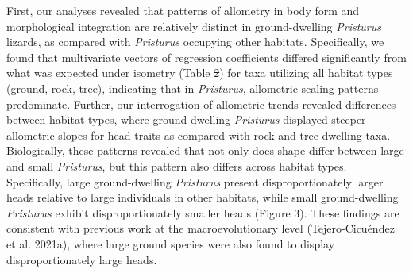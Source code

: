 \documentclass[
  11pt,
]{article}
\providecommand{\DIFaddtex}[1]{{\protect\color{blue}\uwave{#1}}} %
\providecommand{\DIFdeltex}[1]{{\protect\color{red}\sout{#1}}}                      %
\providecommand{\DIFaddbegin}{} %
\providecommand{\DIFaddend}{} %
\providecommand{\DIFdelbegin}{} %
\providecommand{\DIFdelend}{} %
\providecommand{\DIFadd}[1]{\texorpdfstring{\DIFaddtex{#1}}{#1}} %
\providecommand{\DIFdel}[1]{\texorpdfstring{\DIFdeltex{#1}}{}} %
\newcommand{\DIFscaledelfig}{0.5}
\newlength{\DIFdelgraphicswidth} %
\newlength{\DIFdelgraphicsheight} %
\newcommand{\DIFaddincludegraphics}[2][]{{\color{blue}\fbox{\DIFOincludegraphics[#1]{#2}}}} %
\newcommand{\DIFdelincludegraphics}[2][]{%
\sbox{\DIFdelgraphicsbox}{\DIFOincludegraphics[#1]{#2}}%
\settoboxwidth{\DIFdelgraphicswidth}{\DIFdelgraphicsbox} %
\settoboxtotalheight{\DIFdelgraphicsheight}{\DIFdelgraphicsbox} %
\scalebox{\DIFscaledelfig}{%
\parbox[b]{\DIFdelgraphicswidth}{\usebox{\DIFdelgraphicsbox}\\[-\baselineskip] \rule{\DIFdelgraphicswidth}{0em}}\llap{\resizebox{\DIFdelgraphicswidth}{\DIFdelgraphicsheight}{%
\setlength{\unitlength}{\DIFdelgraphicswidth}%
\begin{picture}(1,1)%
\thicklines\linethickness{2pt} %
{\color[rgb]{1,0,0}\put(0,0){\framebox(1,1){}}}%
{\color[rgb]{1,0,0}\put(0,0){\line( 1,1){1}}}%
{\color[rgb]{1,0,0}\put(0,1){\line(1,-1){1}}}%
\end{picture}%
}\hspace*{3pt}}} %
} %
\DeclareRobustCommand{\DIFaddbegin}{\DIFOaddbegin \let\includegraphics\DIFaddincludegraphics} %
\DeclareRobustCommand{\DIFaddend}{\DIFOaddend \let\includegraphics\DIFOincludegraphics} %
\DeclareRobustCommand{\DIFdelbegin}{\DIFOdelbegin \let\includegraphics\DIFdelincludegraphics} %
\DeclareRobustCommand{\DIFdelend}{\DIFOaddend \let\includegraphics\DIFOincludegraphics} %
\begin{document}
First, our analyses revealed that patterns of allometry in body form and
morphological integration are relatively distinct in ground-dwelling
\emph{Pristurus} lizards, as compared with \emph{Pristurus} occupying
other habitats. Specifically, we found that multivariate vectors of
regression coefficients differed significantly from what was expected
under isometry (Table \DIFdelbegin \DIFdel{2}\DIFdelend \DIFaddbegin \DIFadd{3}\DIFaddend ) for taxa utilizing all habitat types (ground,
rock, tree), indicating that in \emph{Pristurus}, allometric scaling
patterns predominate. Further, our interrogation of allometric trends
revealed differences between habitat types, where ground-dwelling
\emph{Pristurus} displayed steeper allometric slopes for head traits as
compared with rock and tree-dwelling taxa. Biologically, these patterns
revealed that not only does shape differ between large and small
\emph{Pristurus}, but this pattern also differs across habitat types.
Specifically, large ground-dwelling \emph{Pristurus} present
disproportionately larger heads relative to large individuals in other
habitats, while small ground-dwelling \emph{Pristurus} exhibit
disproportionately smaller heads (Figure 3). These findings are
consistent with previous work at the macroevolutionary level
(Tejero-Cicuéndez et al. 2021a), where large ground species were also
found to display disproportionately large heads. \hfill\break
\end{document}
